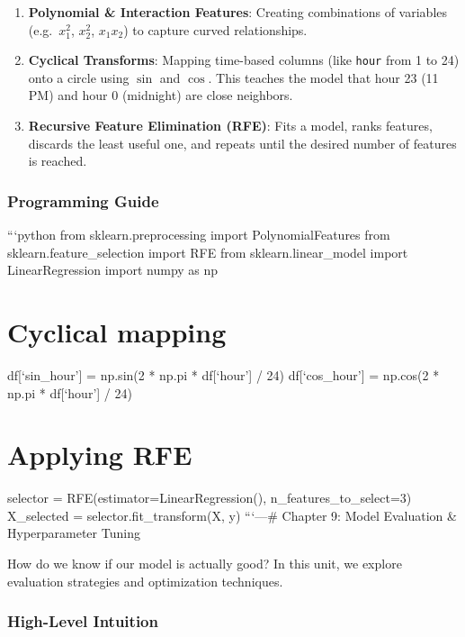 \begin{enumerate}
\def\labelenumi{\arabic{enumi}.}
\tightlist
\item
  \textbf{Polynomial \& Interaction Features}: Creating combinations of
  variables (e.g.~\(x_1^2\), \(x_2^2\), \(x_1 x_2\)) to capture curved
  relationships.
\item
  \textbf{Cyclical Transforms}: Mapping time-based columns (like
  \texttt{hour} from 1 to 24) onto a circle using \(\sin\) and \(\cos\).
  This teaches the model that hour 23 (11 PM) and hour 0 (midnight) are
  close neighbors.
\item
  \textbf{Recursive Feature Elimination (RFE)}: Fits a model, ranks
  features, discards the least useful one, and repeats until the desired
  number of features is reached.
\end{enumerate}

\subsubsection{Programming Guide}\label{programming-guide-7}

```python from sklearn.preprocessing import PolynomialFeatures from
sklearn.feature\_selection import RFE from sklearn.linear\_model import
LinearRegression import numpy as np

\section{Cyclical mapping}\label{cyclical-mapping}

df{[}`sin\_hour'{]} = np.sin(2 * np.pi * df{[}`hour'{]} / 24)
df{[}`cos\_hour'{]} = np.cos(2 * np.pi * df{[}`hour'{]} / 24)

\section{Applying RFE}\label{applying-rfe}

selector = RFE(estimator=LinearRegression(), n\_features\_to\_select=3)
X\_selected = selector.fit\_transform(X, y) ```\n\n---\n\n\# Chapter 9:
Model Evaluation \& Hyperparameter Tuning

How do we know if our model is actually good? In this unit, we explore
evaluation strategies and optimization techniques.

\subsubsection{High-Level Intuition}\label{high-level-intuition-8}

